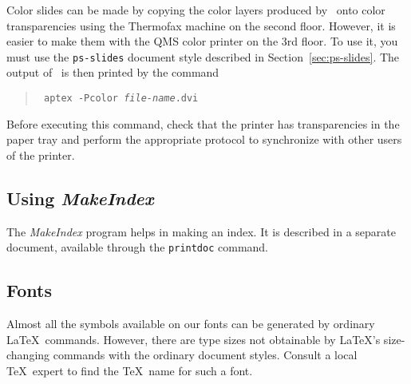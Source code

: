 Color slides can be made by copying the color layers produced by \SLiTeX\
onto color transparencies using the Thermofax machine on the second
floor.  However, it is easier to make them with the QMS color printer 
on the 3rd floor.  To use it, you must use the {\tt ps-slides} 
document style described in Section~\ref{sec:ps-slides}.  The output
of \SLiTeX\ is then printed by the command
\begin{quote} \tt
     aptex -Pcolor {\em file-name}.dvi
\end{quote}
Before executing this command, check that the printer has
transparencies in the paper tray and perform the appropriate protocol
to synchronize with other users of the printer.

\subsection{Using {\em MakeIndex\/}} \label{sec:makeindex}

The {\em MakeIndex\/} program helps in making an index.  It is 
described in a separate document, available through the
{\tt printdoc} command.


\subsection{Fonts}

Almost all the symbols available on our fonts can be generated by
ordinary \LaTeX\ commands.  However, there are type sizes not
obtainable by \LaTeX's size-changing commands with the ordinary
document styles.  Consult a local \TeX\ expert to find the
\TeX\ name for such a font.


